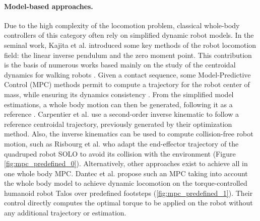 \paragraph{Model-based approaches.}
Due to the high complexity of the locomotion problem, classical whole-body controllers of this category often rely on simplified dynamic robot models.
In the seminal work, Kajita et al. \cite{kajita2003ZMP} introduced some key methods of the robot locomotion field: the linear inverse pendulum and the zero moment point.
This contribution is the basis of numerous works based mainly on the study of the centroidal dynamics for walking robots \cite{Tonneau2018_2PAC, caron_2018_whole_body}.
Given a contact sequence, some Model-Predictive Control (MPC) methods permit to compute a trajectory for the robot center of mass, while ensuring its dynamics consistency \cite{carpentier2016_versatile_efficient, pierre_alexandre_2021}.
From the simplified model estimations, a whole body motion can then be generated, following it as a reference \cite{felix_and_avadesh_2019}.
Carpentier et al. \cite{loco3d} use a second-order inverse kinematic to follow a reference centroidal trajectory, previously generated by their optimization method.
Also, the inverse kinematics can be used to compute collision-free robot motion, such as Risbourg et al. \cite{fanny_mip_solo} who adapt the end-effector trajectory of the quadruped robot SOLO to avoid its collision with the environment (Figure \ref{fig:mpc_predefined_0}). %
Alternatively, other approaches exist to achieve all in one whole body MPC. Dantec et al. \cite{ewen_2022} propose such an MPC taking into account the whole body model to achieve dynamic locomotion on the torque-controlled humanoid robot Talos over predefined footsteps (\ref{fig:mpc_predefined_1}). Their control directly computes the optimal torque to be applied on the robot without any additional trajectory or estimation.



